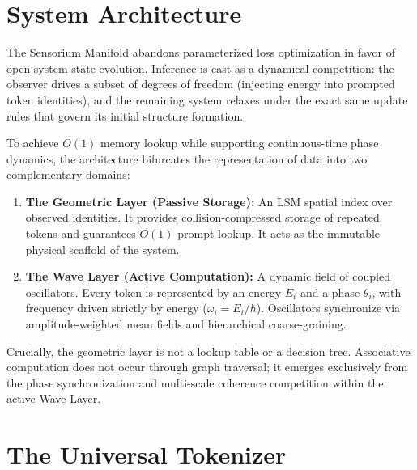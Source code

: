 \documentclass[11pt,a4paper]{article}
\begin{document}




\section{System Architecture}
\label{sec:sensorium}

The Sensorium Manifold abandons parameterized loss optimization in favor of open-system state evolution. Inference is cast as a dynamical competition: the observer drives a subset of degrees of freedom (injecting energy into prompted token identities), and the remaining system relaxes under the exact same update rules that govern its initial structure formation. 

To achieve $O(1)$ memory lookup while supporting continuous-time phase dynamics, the architecture bifurcates the representation of data into two complementary domains:

\begin{enumerate}
  \item \textbf{The Geometric Layer (Passive Storage):} An LSM spatial index over observed identities. It provides collision-compressed storage of repeated tokens and guarantees $O(1)$ prompt lookup. It acts as the immutable physical scaffold of the system.
  \item \textbf{The Wave Layer (Active Computation):} A dynamic field of coupled oscillators. Every token is represented by an energy $E_i$ and a phase $\theta_i$, with frequency driven strictly by energy ($\omega_i = E_i/\hbar$). Oscillators synchronize via amplitude-weighted mean fields and hierarchical coarse-graining. 
\end{enumerate}

Crucially, the geometric layer is not a lookup table or a decision tree. Associative computation does not occur through graph traversal; it emerges exclusively from the phase synchronization and multi-scale coherence competition within the active Wave Layer.


\section{The Universal Tokenizer}
\label{sec:tokenizer}
\end{document}

